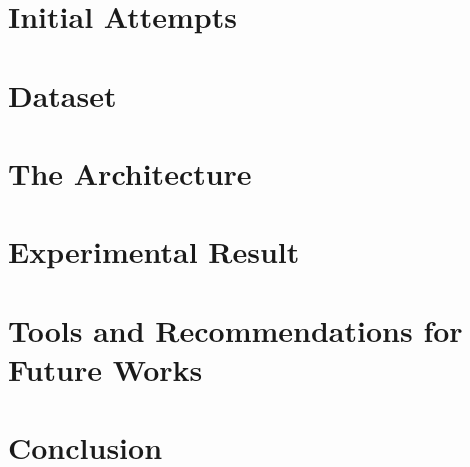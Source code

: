\documentclass[12pt]{report}
\theoremstyle{plain}
\theoremstyle{definition}
\begin{document}
\chapter{Initial Attempts}


\chapter{Dataset}


\chapter{The Architecture}


%

\chapter{Experimental Result}


\chapter{Tools and Recommendations for Future Works}


\chapter{Conclusion}


%


\end{document}
